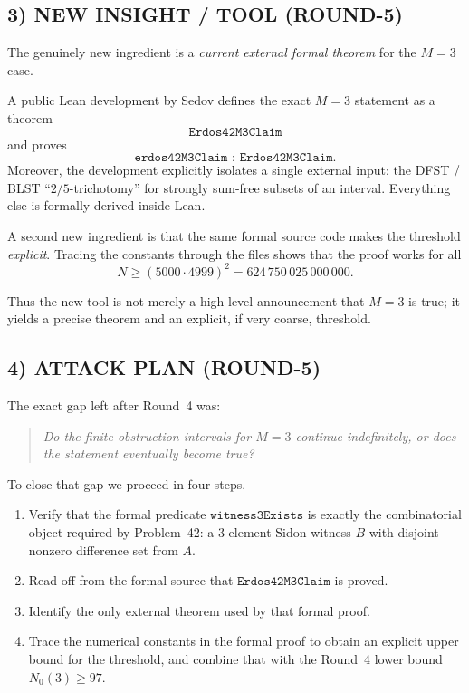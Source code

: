 \subsection{3) NEW INSIGHT / TOOL (ROUND-5)}
The genuinely new ingredient is a \emph{current external formal theorem} for the \(M=3\) case.

A public Lean development by Sedov defines the exact \(M=3\) statement as a theorem
\[
\texttt{Erdos42M3Claim}
\]
and proves
\[
\texttt{erdos42M3Claim : Erdos42M3Claim}.
\]
Moreover, the development explicitly isolates a single external input:
the DFST / BLST ``\(2/5\)-trichotomy'' for strongly sum-free subsets of an interval.
Everything else is formally derived inside Lean.

A second new ingredient is that the same formal source code makes the threshold \emph{explicit}.  Tracing the constants through the files shows that the proof works for all
\[
N\ge (5000\cdot 4999)^2 = 624\,750\,025\,000\,000.
\]

Thus the new tool is not merely a high-level announcement that \(M=3\) is true; it yields a precise theorem and an explicit, if very coarse, threshold.

\subsection{4) ATTACK PLAN (ROUND-5)}
The exact gap left after Round~4 was:
\begin{quote}
\emph{Do the finite obstruction intervals for \(M=3\) continue indefinitely, or does the statement eventually become true?}
\end{quote}

To close that gap we proceed in four steps.

\begin{enumerate}
  \item Verify that the formal predicate \(\texttt{witness3Exists}\) is exactly the combinatorial object required by Problem~42: a 3-element Sidon witness \(B\) with disjoint nonzero difference set from \(A\).
  \item Read off from the formal source that \(\texttt{Erdos42M3Claim}\) is proved.
  \item Identify the only external theorem used by that formal proof.
  \item Trace the numerical constants in the formal proof to obtain an explicit upper bound for the threshold, and combine that with the Round~4 lower bound \(N_0(3)\ge 97\).
\end{enumerate}

